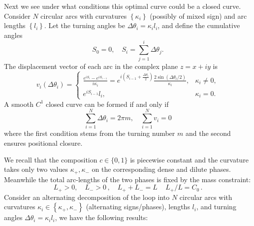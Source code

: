 \documentclass[
aip,
jcp,
reprint, 
floatfix
]{revtex4-1}
\begin{document}
Next we see under what conditions this optimal curve could be a closed curve. Consider $N$ circular arcs with curvatures $\left\{\kappa_i\right\}$ (possibly of mixed sign) and arc lengths $\left\{l_i\right\}$. Let the turning angles be $\Delta \theta_i=\kappa_i l_i$, and define the cumulative angles
$$
S_0=0, \quad S_i=\sum_{j=1}^i \Delta \theta_j .
$$
The displacement vector of each arc in the complex plane $z=x+i y$ is
$$
v_i\left(\Delta \theta_i\right)= \begin{cases}\frac{e^{i S_i}-e^{i S_{i-1}}}{i \kappa_i}=e^{i\left(S_{i-1}+\frac{\Delta \theta_i}{2}\right)} \frac{2 \sin \left(\Delta \theta_i / 2\right)}{\kappa_i}, & \kappa_i \neq 0, \\ e^{i S_{i-1}} l_i, & \kappa_i=0 .\end{cases}
$$
A smooth $C^1$ closed curve can be formed if and only if
$$
\sum_{i=1}^N \Delta \theta_i=2 \pi m, \quad \sum_{i=1}^N v_i=0
$$
where the first condition stems from the turning number $m$ and the second ensures positional closure.

We recall that the composition $c \in\{0,1\}$ is piecewise constant and the curvature takes only two values $\kappa_{+}, \kappa_{-}$ on the corresponding dense and dilute phases. Meanwhile the total arc-lengths of the two phases is fixed by the mass constraint:
$$
L_{+}>0, \quad L_{-}>0\,, \quad L_{+}+L_{-}=L\, \quad L_+/L = C_0\,.
$$
Consider an alternating decomposition of the loop into $N$ circular arcs with curvatures $\kappa_i \in\left\{\kappa_{+}, \kappa_{-}\right\}$ (alternating signs/phases), lengths $l_i$, and turning angles $\Delta \theta_i=\kappa_i l_i$, we have the following results:
\end{document}
